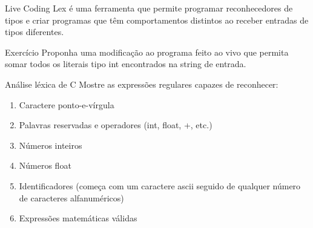 \documentclass{beamer}
\begin{document}
\begin{frame}{Live Coding}
  \centering
  \Large
  Lex é uma ferramenta que permite programar reconhecedores de tipos e criar
  programas que têm comportamentos distintos ao receber entradas de tipos
  diferentes.
\end{frame}

\begin{frame}{Exercício}
  \centering
  \large
  Proponha uma modificação ao programa feito ao vivo que permita somar todos os
  literais tipo int encontrados na string de entrada.
\end{frame}

\begin{frame}{Análise léxica de C}
\large
Mostre as expressões regulares capazes de reconhecer:
  \begin{enumerate}
    \item Caractere ponto-e-vírgula
    \item Palavras reservadas e operadores (int, float, +,  etc.)
    \item Números inteiros
    \item Números float
    \item Identificadores (começa com um caractere ascii seguido de qualquer
      número de caracteres alfanuméricos)
    \item Expressões matemáticas válidas
  \end{enumerate}

\end{frame}
\end{document}
